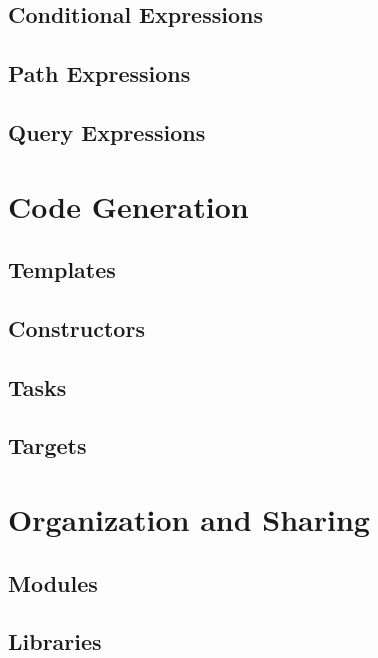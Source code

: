\documentclass[a4paper,oneside,12pt, extrafontsizes]{memoir}
\theoremstyle{definition}
\theoremstyle{definition}
\theoremstyle{definition}
\theoremstyle{definition}
\begin{document}
\chapter{Conditional Expressions}
\label{ch:conditionals}

\chapter{Path Expressions}
\label{ch:paths}

\chapter{Query Expressions}
\label{ch:queries}

\part{Code Generation}

\chapter{Templates}
\label{sec:templates}

\chapter{Constructors}
\label{sec:constructors}

\chapter{Tasks}
\label{sec:tasks}

\chapter{Targets}
\label{sec:targets}

\part{Organization and Sharing}

\chapter{Modules}
\label{ch:modules}

\chapter{Libraries}
\label{ch:libraries}
\end{document}
